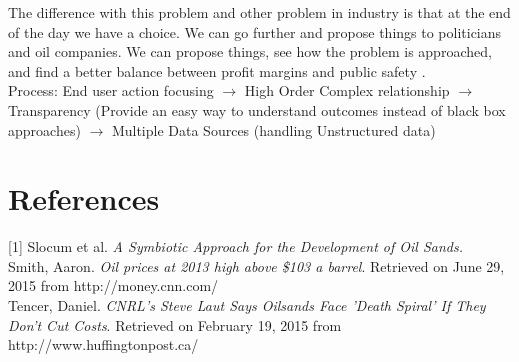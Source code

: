 \documentclass[12pt]{article}
\begin{document}
The difference with this problem and other problem in industry is that at the end of the day we have a choice. We can go further and propose things to politicians and oil companies. We can propose things, see how the problem is approached,  and find a better balance between profit margins and public safety . \\

Process:
End user action focusing $\rightarrow$ High Order Complex relationship $\rightarrow$
Transparency (Provide an easy way to understand outcomes  instead of black box approaches) $\rightarrow$ Multiple Data Sources (handling Unstructured data) 

\newpage

\section{References}

[1] Slocum et al. \emph{A Symbiotic Approach for the Development of Oil Sands.} \\

\noindent [2] Smith, Aaron. \emph{Oil prices at 2013 high above \$103 a barrel}. Retrieved on June 29, 2015 from http://money.cnn.com/ \\

\noindent [3] Tencer, Daniel. \emph{CNRL's Steve Laut Says Oilsands Face 'Death Spiral' If They Don't Cut Costs}. Retrieved on February 19, 2015 from http://www.huffingtonpost.ca/
\end{document}
